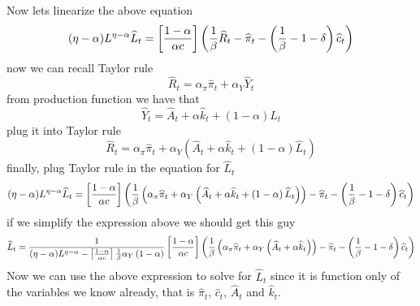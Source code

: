\documentclass{article}
\begin{document}
Now lets linearize the above equation%
\[
(\eta -\alpha )L^{\eta -\alpha }\widehat{L}_{t}=\left[ \frac{1-\alpha }{%
\alpha c}\right] \left( \frac{1}{\beta }\widehat{R}_{t}-\widehat{\pi }%
_{t}-\left( \frac{1}{\beta }-1-\delta \right) \widehat{c}_{t}\right) 
\]%
now we can recall Taylor rule%
\[
\widehat{R}_{t}=\alpha _{\pi }\widehat{\pi }_{t}+\alpha _{Y}\widehat{Y}_{t} 
\]%
from production function we have that 
\[
\widehat{Y}_{t}=\widehat{A}_{t}+\alpha \widehat{k}_{t}+\left( 1-\alpha
\right) \widehat{L}_{t} 
\]%
plug it into Taylor rule%
\[
\widehat{R}_{t}=\alpha _{\pi }\widehat{\pi }_{t}+\alpha _{Y}\left( \widehat{A%
}_{t}+\alpha \widehat{k}_{t}+\left( 1-\alpha \right) \widehat{L}_{t}\right) 
\]%
finally, plug Taylor rule in the equation for $\widehat{L}_{t}$%
\[
(\eta -\alpha )L^{\eta -\alpha }\widehat{L}_{t}=\left[ \frac{1-\alpha }{%
\alpha c}\right] \left( \frac{1}{\beta }\left( \alpha _{\pi }\widehat{\pi }%
_{t}+\alpha _{Y}\left( \widehat{A}_{t}+\alpha \widehat{k}_{t}+\left(
1-\alpha \right) \widehat{L}_{t}\right) \right) -\widehat{\pi }_{t}-\left( 
\frac{1}{\beta }-1-\delta \right) \widehat{c}_{t}\right) 
\]%
if we simplify the expression above we should get this guy%
\begin{equation}
\widehat{L}_{t}=\frac{1}{(\eta -\alpha )L^{\eta -\alpha }-\left[ \frac{%
1-\alpha }{\alpha c}\right] \frac{1}{\beta }\alpha _{Y}\left( 1-\alpha
\right) }\left[ \frac{1-\alpha }{\alpha c}\right] \left( \frac{1}{\beta }%
\left( \alpha _{\pi }\widehat{\pi }_{t}+\alpha _{Y}\left( \widehat{A}%
_{t}+\alpha \widehat{k}_{t}\right) \right) -\widehat{\pi }_{t}-\left( \frac{1%
}{\beta }-1-\delta \right) \widehat{c}_{t}\right)
\end{equation}%
Now we can use the above expression to solve for $\widehat{L}_{t}$ since it
is function only of the variables we know already, that is $\widehat{\pi }%
_{t}$, $\widehat{c}_{t}$, $\widehat{A}_{t}$ and $\widehat{k}_{t}.$
\end{document}
